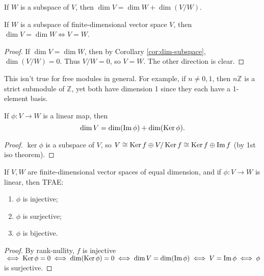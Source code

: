 \documentclass[twoside,10pt]{report}
\begin{document}
\begin{cor}
	\label{cor:dim-subspace}
	If $W$ is a subspace of $V$, then $\dim V = \dim W + \dim(V/W)$.
\end{cor}

\begin{cor}
	If $W$ is a subspace of finite-dimensional vector space $V$, then \\ $\dim V = \dim W \iff V=W$.
\end{cor}
\begin{proof}
	If $\dim V= \dim W$, then by Corollary \ref{cor:dim-subspace}, $\dim(V/W) = 0$. Thus $V/W=0$, so $V = W$. The other direction is clear.
\end{proof}

This isn't true for free modules in general. For example, if $n \neq 0,1$, then $n \mathbb{Z}$ is a strict submodule of $\mathbb{Z}$, yet both have dimension 1 since they each have a 1-element basis.

\begin{thrm}
If $\phi:V\to W$ is a linear map, then
\[
	\dim V = \dim(\operatorname{Im} \phi) + \dim (\operatorname{Ker} \phi).
\] 
\end{thrm}
\begin{proof}
	$\ker \phi$ is a subspace of $V$, so $V \cong \operatorname{Ker} f \oplus V/\operatorname{Ker} f \cong \operatorname{Ker} f \oplus \operatorname{Im} f$ (by 1st iso theorem).
\end{proof}

\begin{cor}
	If $V,W$ are finite-dimensional vector spaces of equal dimension, and if $\phi:V\to W$ is linear, then TFAE:
	\begin{enumerate}
		\item $\phi$ is injective;
		\item $\phi$ is surjective;
		\item $\phi$ is bijective.
	\end{enumerate}
\end{cor}
\begin{proof}
	By rank-nullity, $f$ is injective $\iff \operatorname{Ker} \phi = 0 \iff \dim(\operatorname{Ker} \phi)=0 \iff \dim V = \dim(\operatorname{Im} \phi) \iff V = \operatorname{Im} \phi \iff \phi$ is surjective.
\end{proof}
\end{document}
